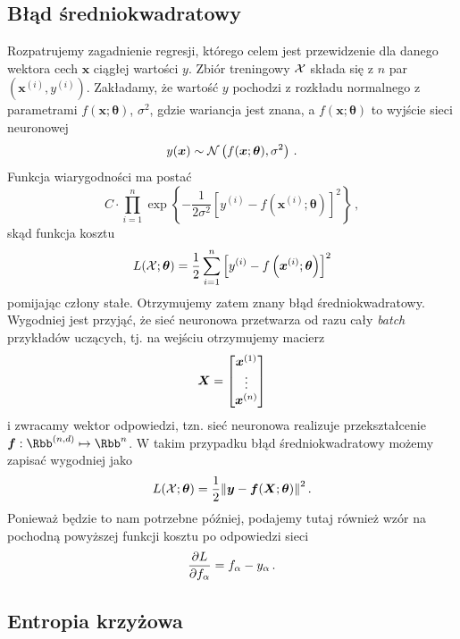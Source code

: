 \documentclass{myclass}
\begin{document}
\subsection{Błąd średniokwadratowy}

Rozpatrujemy zagadnienie regresji, którego celem jest przewidzenie dla danego wektora cech
\(\bm{x}\) ciągłej wartości \(y\). Zbiór treningowy \(\mathcal{X}\) składa się z \(n\) par
\((\bm{x}^{(i)}, y^{(i)})\). Zakładamy, że wartość \(y\) pochodzi z rozkładu normalnego z
parametrami \(f(\bm{x}; \bm{\theta})\), \(\sigma^2\), gdzie wariancja jest znana, a \(f(\bm{x};
\bm{\theta})\) to wyjście sieci neuronowej
\[
    y(\bm{x}) \sim \mathcal{N}\left( f(\bm{x}; \bm{\theta}), \sigma^2 \right) \,.
\]
Funkcja wiarygodności ma postać
\[
    C\cdot\prod_{i=1}^n \exp\left\{-\frac{1}{2\sigma^2} \left[y^{(i)} - f\left(\bm{x}^{(i)}; \bm{\theta}\right) \right]^2\right\}\,,
\]
skąd funkcja kosztu
\[
    L(\mathcal{X}; \bm{\theta}) = \frac{1}{2} \sum_{i=1}^n \left[y^{(i)} - f\left(\bm{x}^{(i)}; \bm{\theta}\right) \right]^2
\]
pomijając człony stałe. Otrzymujemy zatem znany błąd średniokwadratowy. Wygodniej jest przyjąć, że
sieć neuronowa przetwarza od razu cały \emph{batch} przykładów uczących, tj. na wejściu otrzymujemy
macierz
\[
    \bm{X} = \mqty[\bm{x}^{(1)}\\ \vdots \\ \bm{x}^{(n)}]
\]
i zwracamy wektor odpowiedzi, tzn. sieć neuronowa realizuje przekształcenie \(\bm{f} : \Rbb^{(n,d)}
\mapsto \Rbb^n\). W takim przypadku błąd średniokwadratowy możemy zapisać wygodniej jako
\[
    L(\mathcal{X}; \bm{\theta}) = \frac{1}{2} \norm{\bm{y} - \bm{f}(\bm{X}; \bm{\theta})}^2\,.
\]
Ponieważ będzie to nam potrzebne później, podajemy tutaj również wzór na pochodną powyższej funkcji
kosztu po odpowiedzi sieci
\[
    \pdv{L}{f_\alpha} = f_\alpha - y_\alpha \,.
\]


\subsection{Entropia krzyżowa}
\end{document}

